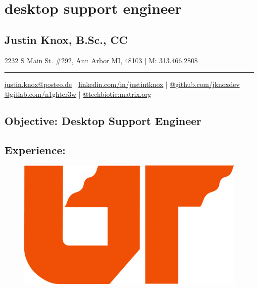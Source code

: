\documentclass[letter,10pt]{article}
\author{arx}
\date{\today}
\title{}
\begin{document}
\section*{desktop support engineer}
\label{sec:org0b3f608}
\subsection*{Justin Knox, B.Sc., CC}
\label{sec:orge2fb256}
2232 S Main St. \#292, Ann Arbor MI, 48103 | M: 313.466.2808

\noindent\rule{\textwidth}{0.5pt}
\href{mailto:justin.knox@posteo.de}{justin.knox@posteo.de} | \href{https://www.linkedin.com/in/justintknox}{linkedin.com/in/justintknox} | \href{https://www.github.com/jknoxdev}{@github.com/jknoxdev} \\
\href{https://gitlab.com/n1ghtcr3w}{@gitlab.com/n1ghtcr3w} | \href{https://matrix.to/\#/@techbiotic:matrix.org}{@techbiotic:matrix.org}


\subsection*{Objective:              Desktop Support Engineer}
\label{sec:orgb93554c}
\subsection*{Experience:}
\label{sec:orgbf18ca9}
\begin{figure}
\includegraphics[width=0.45\linewidth]{./img/50p_cr_utk.jpg}
\end{figure}
\end{document}
